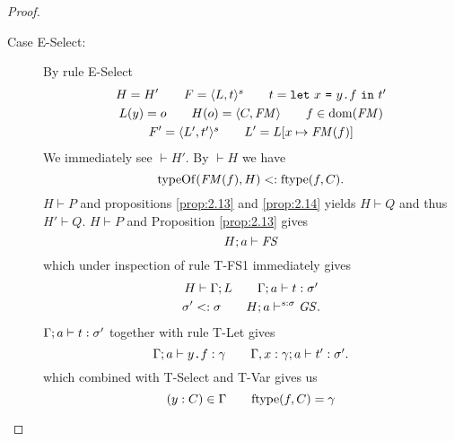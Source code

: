 \begin{proof}
\begin{description}
\begin{description}
\begin{description}
            \item[Case {\sc E-Select}:] By rule {\sc E-Select}
              \begin{equation} \label{eq:eselect1}
                \begin{gathered}
                  H = H' \quad\quad F = \mbox{$\langle L, t \rangle^s$} \quad\quad t =
                  \mbox{\mdseries\texttt{let}~$x$~\texttt{=}~$\mbox{\mdseries$y$\texttt{.}$f$}$~\texttt{in}~$t'$} \\
                  L(y) = o \quad\quad H(o) = \mbox{$\langle C, \mathit{FM} \rangle$} \quad\quad f \in \mbox{$\mathrm{dom}$}(\mathit{FM})
                  \\
                  F' = \mbox{$\langle L', t' \rangle^s$} \quad\quad L' = L[x \mapsto \mathit{FM}(f)]
                \end{gathered}
              \end{equation}
              We immediately see $\vdash H'$. By $\vdash H$ we have
              \begin{equation} \label{eq:eselect2}
                \mbox{$\mathrm{typeOf}$}(\mathit{FM}(f), H) <: \mbox{$\mathrm{ftype}$}(f, C).
              \end{equation}
              $H \vdash P$ and propositions \ref{prop:2.13} and \ref{prop:2.14} yields
              $H \vdash Q$ and thus $H' \vdash Q$.
              $H \vdash P$ and Proposition \ref{prop:2.13} gives 
              \begin{equation} \label{eq:eselect3}
                H; a \vdash \mathit{FS}
              \end{equation}
              which under inspection of rule {\sc T-FS1} immediately gives
              \begin{equation} \label{eq:eselect4}
                \begin{gathered}
                  H \vdash \Gamma; L \quad\quad \mbox{$\Gamma;a\vdash t:\sigma'$} \\
                  \sigma' <: \sigma \quad\quad H; a \vdash^{s: \sigma} \mathit{GS}.
                \end{gathered}
              \end{equation}
              $\mbox{$\Gamma;a\vdash t:\sigma'$}$ together with rule {\sc T-Let}
              gives
              \begin{equation} \label{eq:eselect5}
                \mbox{$\Gamma;a\vdash\mbox{\mdseries$y$\texttt{.}$f$}:\gamma$} \quad\quad
                \mbox{$\Gamma, x: \gamma;a\vdash t':\sigma'$}.
              \end{equation}
              which combined with {\sc T-Select} and {\sc T-Var} gives us
              \begin{equation} \label{eq:eselect6}
                (y: C) \in \Gamma \andalso \ftype(f, C) = \gamma

\end{equation}
\end{description}
\end{description}
\end{description}
\end{proof}
